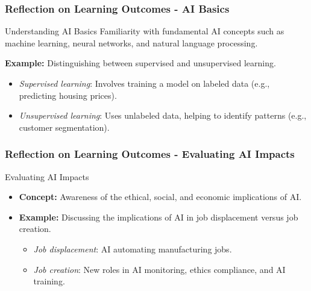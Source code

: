 \documentclass{beamer}
\begin{document}
\begin{frame}[fragile]
    \frametitle{Reflection on Learning Outcomes - AI Basics}
    \begin{block}{Understanding AI Basics}
        Familiarity with fundamental AI concepts such as machine learning, neural networks, and natural language processing. 

        \textbf{Example:} Distinguishing between supervised and unsupervised learning. 
        \begin{itemize}
            \item \textit{Supervised learning}: Involves training a model on labeled data (e.g., predicting housing prices).
            \item \textit{Unsupervised learning}: Uses unlabeled data, helping to identify patterns (e.g., customer segmentation).
        \end{itemize}
    \end{block}
\end{frame}

\begin{frame}
    \frametitle{Reflection on Learning Outcomes - Evaluating AI Impacts}
    \begin{block}{Evaluating AI Impacts}
        \begin{itemize}
            \item \textbf{Concept:} Awareness of the ethical, social, and economic implications of AI.
            \item \textbf{Example:} Discussing the implications of AI in job displacement versus job creation.
            \begin{itemize}
                \item \textit{Job displacement}: AI automating manufacturing jobs.
                \item \textit{Job creation}: New roles in AI monitoring, ethics compliance, and AI training.
            \end{itemize}
        \end{itemize}
    \end{block}
\end{frame}
\end{document}
